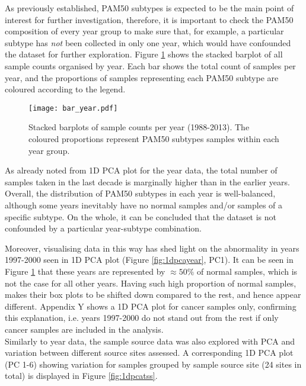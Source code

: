     \newpage
    As previously established, PAM50 subtypes is expected to be the main point of interest for further investigation, therefore, it is important to check the PAM50 composition of every year group to make sure that, for example, a particular subtype has \textit{not} been collected in only one year, which would have confounded the dataset for further exploration. Figure \ref{fig:baryear} shows the stacked barplot of all sample counts organised by year. Each bar shows the total count of samples per year, and the proportions of samples representing each PAM50 subtype are coloured according to the legend. \\
    \newline
    
    
            \begin{figure}[!h]
            \centering
            \texttt{[image: bar\_year.pdf]}
            \caption[Stacked barplots of sample counts per year]{Stacked barplots of sample counts per year (1988-2013). The coloured proportions represent PAM50 subtypes samples within each year group. }
            \label{fig:baryear}
            \end{figure}
    
    As already noted from 1D PCA plot for the year data, the total number of samples taken in the last decade is marginally higher than in the earlier years. Overall, the distribution of PAM50 subtypes in each year is well-balanced,  although some years inevitably have no normal samples and/or samples of a specific subtype. On the whole, it can be concluded that the dataset is not confounded by a particular year-subtype combination.  
    
    Moreover, visualising data in this way has shed light on the abnormality in years 1997-2000 seen in 1D PCA plot (Figure \ref{fig:1dpcayear}, PC1). It can be seen in Figure \ref{fig:baryear} that these years are represented by $\approx50\%$ of normal samples, which is not the case for all other years. Having such high proportion of normal samples, makes their box plots to be shifted down compared to the rest, and hence appear different. Appendix Y shows a 1D PCA plot for cancer samples only, confirming this explanation, i.e. years 1997-2000 do not stand out from the rest if only cancer samples are included in the analysis. \\
    
    \newpage
    Similarly to year data, the sample source data was also explored with PCA and variation between different source sites assessed. A corresponding 1D PCA plot (PC 1-6) showing variation for samples grouped by sample source site (24 sites in total) is displayed in Figure \ref{fig:1dpcatss}. \\
    \newline
    
